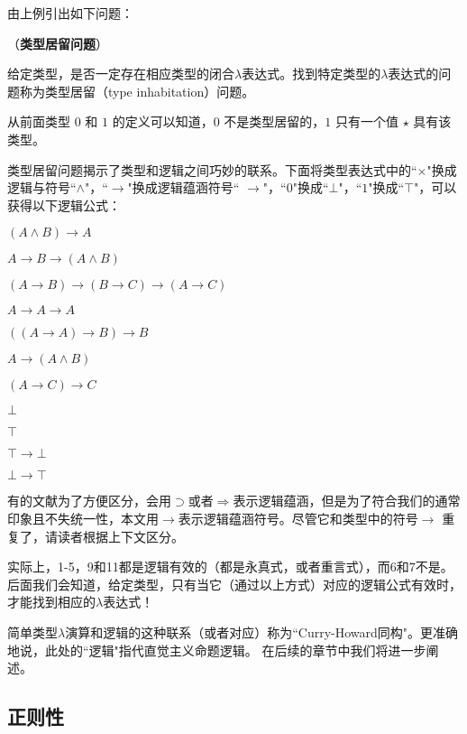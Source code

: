 由上例引出如下问题：

\begin{defn} （\textbf{类型居留问题}）

给定类型，是否一定存在相应类型的闭合$\lambda$表达式。找到特定类型的$\lambda$表达式的问题称为类型居留（type inhabitation）问题。

\end{defn}

从前面类型 $0$ 和 $1$ 的定义可以知道，$0$ 不是类型居留的，$1$ 只有一个值 $\star$ 具有该类型。

类型居留问题揭示了类型和逻辑之间巧妙的联系。下面将类型表达式中的``$\times$"换成逻辑与符号``$\land$"，``$\to$"换成逻辑蕴涵符号`` $\to$"，``$0$"换成``$\bot$"，``$1$"换成``$\top$"，可以获得以下逻辑公式：

\begin{tightenum}
  \item $( A \land B) \to A$
  \item $A \to B \to (A \land B)$
  \item $(A \to B) \to (B \to C) \to (A \to C)$
  \item $A \to A \to A$
  \item $((A \to A) \to B) \to B$
  \item $A \to (A \land B)$
  \item $(A \to C) \to C$
  \item $\bot$
  \item $\top$
  \item $\top \to \bot$
  \item $\bot \to \top$
\end{tightenum}

\begin{rem}
有的文献为了方便区分，会用$\supset$或者$\Rightarrow$表示逻辑蕴涵，但是为了符合我们的通常印象且不失统一性，本文用$\to$表示逻辑蕴涵符号。尽管它和类型中的符号$\to$ 重复了，请读者根据上下文区分。
\end{rem}

实际上，1-5，9和11都是逻辑有效的（都是永真式，或者重言式），而6和7不是。
后面我们会知道，给定类型，只有当它（通过以上方式）对应的逻辑公式有效时，才能找到相应的$\lambda$表达式！

简单类型$\lambda$演算和逻辑的这种联系（或者对应）称为``Curry-Howard同构"。更准确地说，此处的``逻辑"指代直觉主义命题逻辑。 在后续的章节中我们将进一步阐述。


\subsection{正则性}


